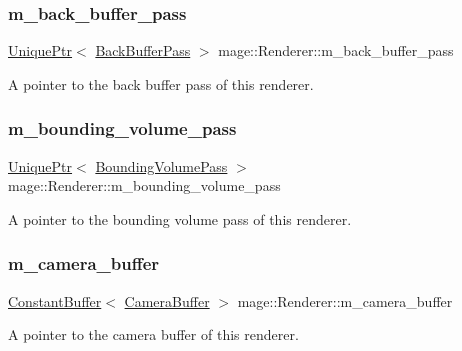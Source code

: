 \subsubsection{\texorpdfstring{m\+\_\+back\+\_\+buffer\+\_\+pass}{m\_back\_buffer\_pass}}
{\footnotesize\ttfamily \hyperlink{namespacemage_a3316d7143a973e37adf1110f2e80ca31}{Unique\+Ptr}$<$ \hyperlink{classmage_1_1_back_buffer_pass}{Back\+Buffer\+Pass} $>$ mage\+::\+Renderer\+::m\+\_\+back\+\_\+buffer\+\_\+pass\hspace{0.3cm}{\ttfamily [private]}}

A pointer to the back buffer pass of this renderer. \hypertarget{classmage_1_1_renderer_a36271439a6217d1fd9b9162f5d90b738}{}\label{classmage_1_1_renderer_a36271439a6217d1fd9b9162f5d90b738} 
\subsubsection{\texorpdfstring{m\+\_\+bounding\+\_\+volume\+\_\+pass}{m\_bounding\_volume\_pass}}
{\footnotesize\ttfamily \hyperlink{namespacemage_a3316d7143a973e37adf1110f2e80ca31}{Unique\+Ptr}$<$ \hyperlink{classmage_1_1_bounding_volume_pass}{Bounding\+Volume\+Pass} $>$ mage\+::\+Renderer\+::m\+\_\+bounding\+\_\+volume\+\_\+pass\hspace{0.3cm}{\ttfamily [private]}}

A pointer to the bounding volume pass of this renderer. \hypertarget{classmage_1_1_renderer_ac6ea5b2ff22e051400a693b3f98ef816}{}\label{classmage_1_1_renderer_ac6ea5b2ff22e051400a693b3f98ef816} 
\subsubsection{\texorpdfstring{m\+\_\+camera\+\_\+buffer}{m\_camera\_buffer}}
{\footnotesize\ttfamily \hyperlink{classmage_1_1_constant_buffer}{Constant\+Buffer}$<$ \hyperlink{structmage_1_1_camera_buffer}{Camera\+Buffer} $>$ mage\+::\+Renderer\+::m\+\_\+camera\+\_\+buffer\hspace{0.3cm}{\ttfamily [private]}}

A pointer to the camera buffer of this renderer. \hypertarget{classmage_1_1_renderer_a263748ea2ded028b1885f122e62caf39}{}\label{classmage_1_1_renderer_a263748ea2ded028b1885f122e62caf39} 
